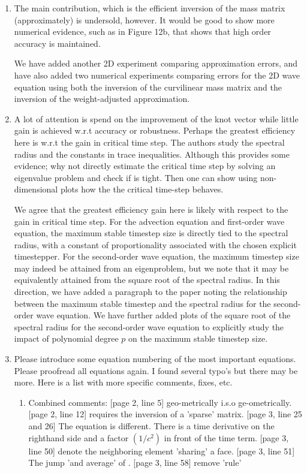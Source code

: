 \documentclass[10pt]{article}
\newcommand{\note}[1]{{\color{violet}#1}}
\begin{document}
\begin{enumerate}
\item The main contribution, which is the efficient inversion of the mass matrix (approximately) is undersold, however. It would be good to show more numerical evidence, such as in Figure 12b, that shows that high order accuracy is maintained.

\note{We have added another 2D experiment comparing approximation errors, and have also added two numerical experiments comparing errors for the 2D wave equation using both the inversion of the curvilinear mass matrix and the inversion of the weight-adjusted approximation.} 

\item A lot of attention is spend on the improvement of the knot vector while little gain is achieved w.r.t accuracy or robustness. Perhaps the greatest efficiency here is w.r.t the gain in critical time step. The authors study the spectral radius and the constants in trace inequalities. Although this provides some evidence; why not directly estimate the critical time step by solving an eigenvalue problem and check if is tight. Then one can show using non-dimensional plots how the the critical time-step behaves.  

\note{We agree that the greatest efficiency gain here is likely with respect to the gain in critical time step.  For the advection equation and first-order wave equation, the maximum stable timestep size is directly tied to the spectral radius, with a constant of proportionality associated with the chosen explicit timestepper.  For the second-order wave equation, the maximum timestep size may indeed be attained from an eigenproblem, but we note that it may be equivalently attained from the square root of the spectral radius.  In this direction, we have added a paragraph to the paper noting the relationship between the maximum stable timestep and the spectral radius for the second-order wave equation.  We have further added plots of the square root of the spectral radius for the second-order wave equation to explicitly study the impact of polynomial degree $p$ on the maximum stable timestep size.}

\item Please introduce some equation numbering of the most important equations. Please proofread all equations again. I found several typo's but there may be more. Here is a list with more specific comments, fixes, etc.

\begin{enumerate}
\item Combined comments: [page 2, line 5]  geo-metrically i.s.o  ge-ometrically.  [page 2, line 12] requires the inversion of a 'sparse' matrix.  [page 3, line 25 and 26] The equation is different. There is a time derivative on the righthand side and a factor $(1/c^2)$ in front of the time term.  [page 3, line 50]                  denote the neighboring element 'sharing' a face.  [page 3, line 51] The jump 'and average' of .  [page 3, line 58] remove 'rule'


\end{enumerate}
\end{enumerate}
\end{document}
